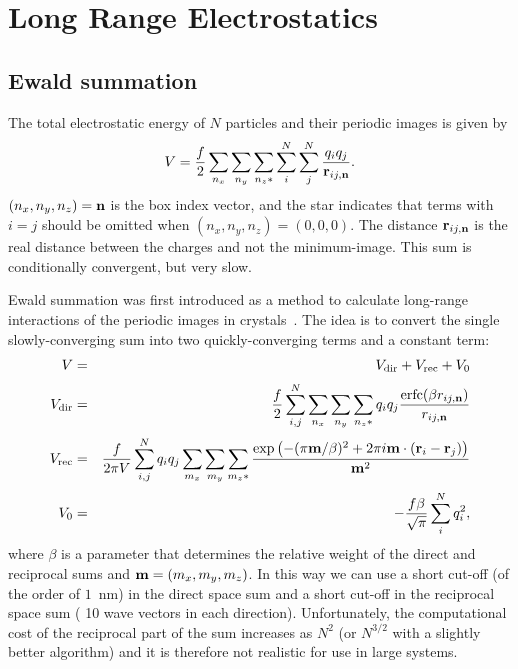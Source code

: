 \newcommand{\dr}{{\rm d}r}
\newcommand{\avcsix}{\left< C_6 \right>}

\section{Long Range Electrostatics}
\label{sec:lr_elstat}
\subsection{Ewald summation}
\label{sec:ewald}
The total electrostatic energy of $N$ particles and their periodic
images is given by
\begin{equation}
V=\frac{f}{2}\sum_{n_x}\sum_{n_y}
\sum_{n_{z}*} \sum_{i}^{N} \sum_{j}^{N}
\frac{q_i q_j}{{\bf r}_{ij,{\bf n}}}.
\label{eqn:totalcoulomb}
\end{equation}
$(n_x,n_y,n_z)={\bf n}$ is the box index vector, and the star indicates that
terms with $i=j$ should be omitted when $(n_x,n_y,n_z)=(0,0,0)$. The
distance ${\bf r}_{ij,{\bf n}}$ is the real distance between the charges and
not the minimum-image. This sum is conditionally convergent, but
very slow.

Ewald summation was first introduced as a method to calculate
long-range interactions of the periodic images in
crystals~\cite{Ewald21}. The idea is to convert the single
slowly-converging sum  into two
quickly-converging terms and a constant term:
\begin{eqnarray}
V &=& V_{\mathrm{dir}} + V_{\mathrm{rec}} + V_{0} \\[0.5ex]
V_{\mathrm{dir}} &=& \frac{f}{2} \sum_{i,j}^{N}
\sum_{n_x}\sum_{n_y}
\sum_{n_{z}*} q_i q_j \frac{\mbox{erfc}(\beta {r}_{ij,{\bf n}} )}{{r}_{ij,{\bf n}}} \\[0.5ex]
V_{\mathrm{rec}} &=& \frac{f}{2 \pi V} \sum_{i,j}^{N} q_i q_j
\sum_{m_x}\sum_{m_y}
\sum_{m_{z}*} \frac{\exp{\left( -(\pi {\bf m}/\beta)^2 + 2 \pi i
      {\bf m} \cdot ({\bf r}_i - {\bf r}_j)\right)}}{{\bf m}^2} \\[0.5ex]
V_{0} &=& -\frac{f \beta}{\sqrt{\pi}}\sum_{i}^{N} q_i^2,
\end{eqnarray}
where $\beta$ is a parameter that determines the relative weight of the
direct and reciprocal sums and ${\bf m}=(m_x,m_y,m_z)$.
In this way we can use a short cut-off (of the order of $1$~nm) in the direct space sum and a
short cut-off in the reciprocal space sum ({\eg} 10 wave vectors in each
direction). Unfortunately, the computational cost of the reciprocal
part of the sum increases as $N^2$
(or $N^{3/2}$ with a slightly better algorithm) and it is therefore not
realistic for use in large systems.

